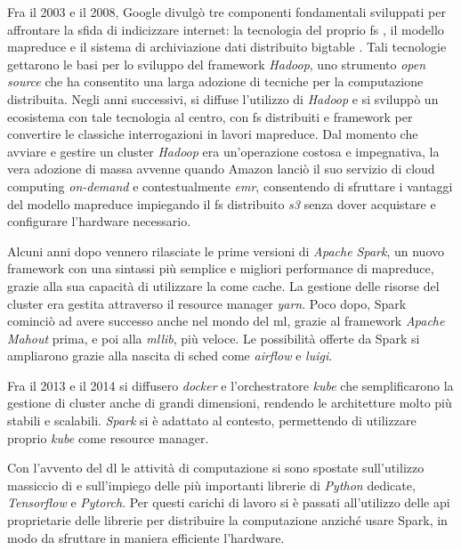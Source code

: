 \documentclass[12pt,a4paper,fleqn,titlepage]{report}
\begin{document}
Fra il 2003 e il 2008, Google divulgò tre componenti fondamentali sviluppati per affrontare la sfida di indicizzare internet: la tecnologia del proprio \gls{fs} \cite{ghemawat:2003}, il modello \gls{mapreduce} \cite{dean:2008} e il sistema di archiviazione dati distribuito \gls{bigtable} \cite{chang:2008}. Tali tecnologie gettarono le basi per lo sviluppo del framework \emph{Hadoop}, uno strumento \textit{open source} che ha consentito una larga adozione di tecniche per la computazione distribuita. Negli anni successivi, si diffuse l'utilizzo di \emph{Hadoop} e si sviluppò un ecosistema con tale tecnologia al centro, con \gls{fs} distribuiti e framework per convertire le classiche interrogazioni \emph{} in lavori \gls{mapreduce}. Dal momento che avviare e gestire un \gls{cluster} \emph{Hadoop} era un'operazione costosa e impegnativa, la vera adozione di massa avvenne quando Amazon lanciò il suo servizio di cloud computing \textit{on-demand} e contestualmente \emph{\gls{emr}}, consentendo di sfruttare i vantaggi del modello \gls{mapreduce} impiegando il \gls{fs} distribuito \emph{\gls{s3}} senza dover acquistare e configurare l'hardware necessario.

Alcuni anni dopo vennero rilasciate le prime versioni di \emph{Apache Spark}, un nuovo framework con una sintassi più semplice e migliori performance di \gls{mapreduce}, grazie alla sua capacità di utilizzare la  come cache. La gestione delle risorse del cluster era gestita attraverso il resource manager \emph{\gls{yarn}}.
Poco dopo, Spark cominciò ad avere successo anche nel mondo del \gls{ml}, grazie al framework \emph{Apache Mahout} prima, e poi alla \emph{\gls{mllib}}, più veloce. Le possibilità offerte da Spark si ampliarono grazie alla nascita di \gls{sched} come \emph{\gls{airflow}} e \emph{\gls{luigi}}.

Fra il 2013 e il 2014 si diffusero \emph{\gls{docker}} e l'orchestratore \emph{\gls{kube}} che semplificarono la gestione di \gls{cluster} anche di grandi dimensioni, rendendo le architetture molto più stabili e scalabili. \emph{Spark} si è adattato al contesto, permettendo di utilizzare proprio \emph{\gls{kube}} come resource manager.

Con l'avvento del \gls{dl} le attività di computazione si sono spostate sull'utilizzo massiccio di  e sull'impiego delle più importanti librerie di \emph{Python} dedicate, \emph{Tensorflow} e \emph{Pytorch}. Per questi carichi di lavoro si è passati all'utilizzo delle \gls{api} proprietarie delle librerie per distribuire la computazione anziché usare Spark, in modo da sfruttare in maniera efficiente l'hardware.
\end{document}
